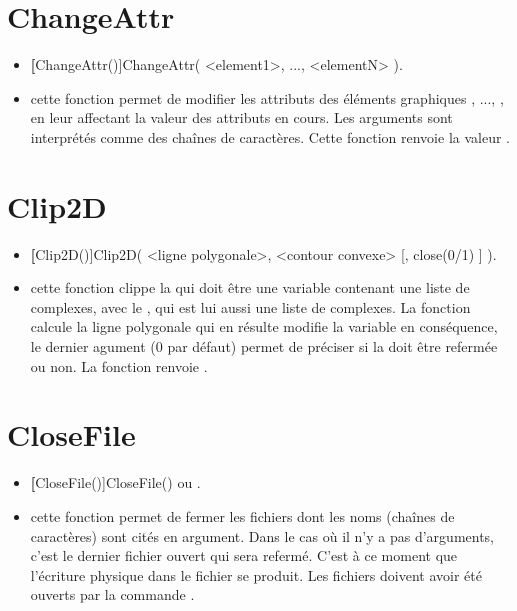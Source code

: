\section{ChangeAttr}\label{cmdChangeAttr}

\begin{itemize}
 \item \util \textbf[ChangeAttr()]{ChangeAttr( <element1>, ..., <elementN> )}.
 \item \desc cette fonction permet de modifier les attributs des éléments graphiques , ..., , en leur affectant la valeur des attributs en cours. Les arguments sont interprétés comme des chaînes de caractères. Cette fonction renvoie la valeur \Nil.
\end{itemize}

\section{Clip2D}\label{cmdClip2D}

\begin{itemize}
 \item \util \textbf[Clip2D()]{Clip2D( <ligne polygonale>, <contour convexe> [, close(0/1) ] )}. 
 \item \desc cette fonction clippe la  qui doit être une variable contenant une liste de complexes, avec le , qui est lui aussi une liste de complexes. La fonction calcule la ligne polygonale qui en résulte modifie la variable  en conséquence, le dernier agument  ($0$ par défaut) permet de préciser si la  doit être refermée ou non. La fonction renvoie \Nil.
\end{itemize}

\section{CloseFile}\label{cmdCloseFile}

\begin{itemize}
 \item \util \textbf[CloseFile()]{CloseFile()} ou . 
 \item \desc cette fonction permet de fermer les fichiers dont les noms (chaînes de caractères) sont cités en argument. Dans le cas où il n'y a pas d'arguments, c'est le dernier fichier ouvert qui sera refermé. C'est à ce moment que l'écriture physique dans le fichier se produit. Les fichiers doivent avoir été ouverts par la commande . 
 \end{itemize}


